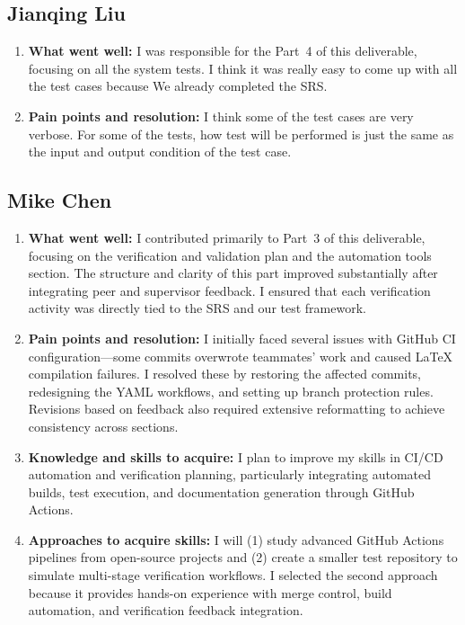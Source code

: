 \documentclass[12pt, titlepage]{article}
\begin{document}
\subsection*{Jianqing Liu}
\begin{enumerate}
  \item \textbf{What went well:}
        I was responsible for the Part~4 of this deliverable, focusing on all the system tests. I think it 
        was really easy to come up with all the test cases because We already completed the SRS.

  \item \textbf{Pain points and resolution:}
        I think some of the test cases are very verbose. For some of the tests, how test will be performed 
        is just the same as the input and output condition of the test case.
\end{enumerate}

\subsection*{Mike Chen}
\begin{enumerate}
  \item \textbf{What went well:}
        I contributed primarily to Part~3 of this deliverable, focusing on the verification and validation plan
        and the automation tools section. The structure and clarity of this part improved substantially after
        integrating peer and supervisor feedback. I ensured that each verification activity was directly tied
        to the SRS and our test framework.

  \item \textbf{Pain points and resolution:}
        I initially faced several issues with GitHub CI configuration—some commits overwrote teammates’
        work and caused LaTeX compilation failures. I resolved these by restoring the affected commits,
        redesigning the YAML workflows, and setting up branch protection rules. Revisions based on
        feedback also required extensive reformatting to achieve consistency across sections.

  \item \textbf{Knowledge and skills to acquire:}
        I plan to improve my skills in CI/CD automation and verification planning, particularly integrating
        automated builds, test execution, and documentation generation through GitHub Actions.

  \item \textbf{Approaches to acquire skills:}
        I will (1) study advanced GitHub Actions pipelines from open-source projects and (2) create a
        smaller test repository to simulate multi-stage verification workflows. I selected the second
        approach because it provides hands-on experience with merge control, build automation, and
        verification feedback integration.
\end{enumerate}
\end{document}
